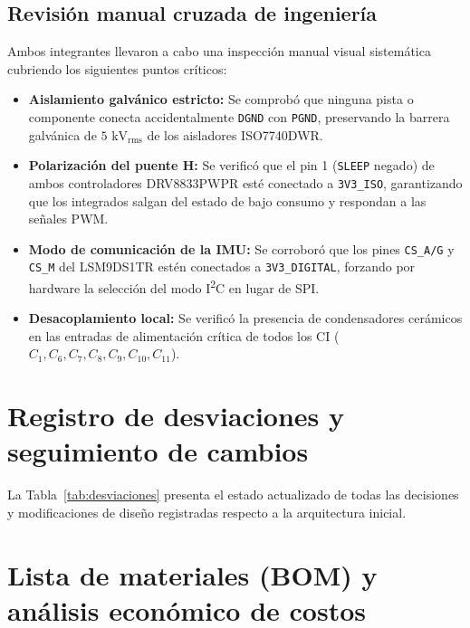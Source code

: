 \documentclass[11pt,a4paper]{article}
\begin{document}
\subsection{Revisión manual cruzada de ingeniería}
Ambos integrantes llevaron a cabo una inspección manual visual sistemática cubriendo los siguientes puntos críticos:
\begin{itemize}
    \item \textbf{Aislamiento galvánico estricto:} Se comprobó que ninguna pista o componente conecta accidentalmente \texttt{DGND} con \texttt{PGND}, preservando la barrera galvánica de $5\text{ kV}_{\text{rms}}$ de los aisladores ISO7740DWR.
    \item \textbf{Polarización del puente H:} Se verificó que el pin 1 (\texttt{SLEEP} negado) de ambos controladores DRV8833PWPR esté conectado a \texttt{3V3\_ISO}, garantizando que los integrados salgan del estado de bajo consumo y respondan a las señales PWM.
    \item \textbf{Modo de comunicación de la IMU:} Se corroboró que los pines \texttt{CS\_A/G} y \texttt{CS\_M} del LSM9DS1TR estén conectados a \texttt{3V3\_DIGITAL}, forzando por hardware la selección del modo I\textsuperscript{2}C en lugar de SPI.
    \item \textbf{Desacoplamiento local:} Se verificó la presencia de condensadores cerámicos en las entradas de alimentación crítica de todos los CI ($C_1, C_6, C_7, C_8, C_9, C_{10}, C_{11}$).
\end{itemize}

\section{Registro de desviaciones y seguimiento de cambios}\label{sec:desv}

La Tabla~\ref{tab:desviaciones} presenta el estado actualizado de todas las decisiones y modificaciones de diseño registradas respecto a la arquitectura inicial.


\label{tab:desviaciones}

\section{Lista de materiales (BOM) y análisis económico de costos}\label{sec:bom}
\end{document}
